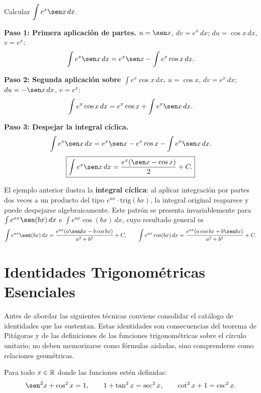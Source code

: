 \begin{example}
Calcular $\displaystyle\int e^x \sen x\, dx$.

\begin{myproof}

\textbf{Paso 1: Primera aplicación de partes.}
$u = \sen x$, $dv = e^x\,dx$; $du = \cos x\,dx$, $v = e^x$:
\[
\int e^x \sen x\, dx = e^x \sen x - \int e^x \cos x\, dx.
\]

\textbf{Paso 2: Segunda aplicación sobre $\int e^x\cos x\,dx$.}
$u = \cos x$, $dv = e^x\,dx$; $du = -\sen x\,dx$, $v = e^x$:
\[
\int e^x \cos x\, dx = e^x\cos x + \int e^x \sen x\, dx.
\]

\textbf{Paso 3: Despejar la integral cíclica.}
\[
\int e^x \sen x\, dx = e^x\sen x - e^x\cos x - \int e^x\sen x\, dx.
\]
\[
\boxed{\int e^x\sen x\, dx = \frac{e^x(\sen x - \cos x)}{2} + C.}
\]
\end{myproof}
\end{example}

\begin{wow}
El ejemplo anterior ilustra la \textbf{integral cíclica}: al aplicar
integración por partes dos veces a un producto del tipo $e^{ax}\cdot
\text{trig}(bx)$, la integral original reaparece y puede despejarse
algebraicamente. Este patrón se presenta invariablemente para
$\int e^{ax}\sen(bx)\,dx$ e $\int e^{ax}\cos(bx)\,dx$, cuyo resultado
general es
\[
\int e^{ax}\sen(bx)\,dx = \frac{e^{ax}(a\sen bx - b\cos bx)}{a^2+b^2}+C,
\qquad
\int e^{ax}\cos(bx)\,dx = \frac{e^{ax}(a\cos bx + b\sen bx)}{a^2+b^2}+C.
\]
\end{wow}

\section{Identidades Trigonométricas Esenciales}

Antes de abordar las siguientes técnicas conviene consolidar el catálogo de
identidades que las sustentan. Estas identidades son consecuencias del
teorema de Pitágoras y de las definiciones de las funciones trigonométricas
sobre el círculo unitario; no deben memorizarse como fórmulas aisladas,
sino comprenderse como relaciones geométricas.

\begin{theorem}
Para todo $x \in {\mathbb R}$ donde las funciones estén definidas:
\[
\sen^2 x + \cos^2 x = 1, \qquad
1 + \tan^2 x = \sec^2 x, \qquad
\cot^2 x + 1 = \csc^2 x.
\]
\end{theorem}

